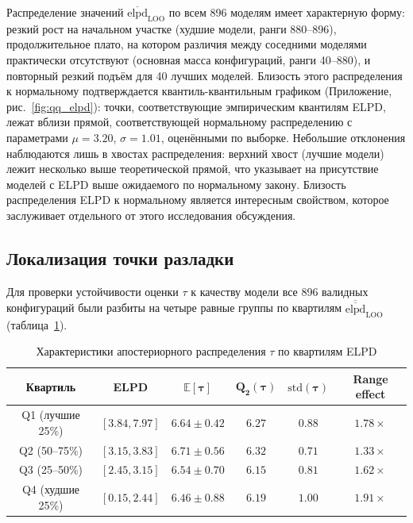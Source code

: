\documentclass[14pt]{mmcs_article}
\begin{document}
Распределение значений $\overline{\mathrm{elpd}}_{\mathrm{LOO}}$
по всем 896 моделям имеет характерную форму: резкий рост на
начальном участке (худшие модели, ранги 880--896),
продолжительное плато, на котором различия между соседними
моделями практически отсутствуют (основная масса
конфигураций, ранги 40--880), и повторный резкий подъём для
40 лучших моделей. Близость этого распределения к нормальному
подтверждается квантиль-квантильным графиком (Приложение, рис.~\ref{fig:qq_elpd}): точки, соответствующие
эмпирическим квантилям ELPD, лежат вблизи прямой,
соответствующей нормальному распределению с параметрами
$\mu = 3.20$, $\sigma = 1.01$, оценёнными по выборке.
Небольшие отклонения наблюдаются лишь в хвостах
распределения: верхний хвост (лучшие модели) лежит несколько
выше теоретической прямой, что указывает на присутствие
моделей с ELPD выше ожидаемого по нормальному закону. Близость распределения ELPD к нормальному является интересным свойством, которое заслуживает отдельного от этого исследования обсуждения.

\subsection{Локализация точки разладки}

Для проверки устойчивости оценки $\tau$ к качеству модели все
896 валидных конфигураций были разбиты на четыре равные группы
по квартилям $\overline{\overline{\mathrm{elpd}}}_{\mathrm{LOO}}$
(таблица~\ref{tab:tau_quartiles}).

\begin{table}[H]
	\centering
	\caption{Характеристики апостериорного распределения $\tau$
		по квартилям ELPD}
	\label{tab:tau_quartiles}
	\begin{tabular}{|c|c|c|c|c|c|}
		\hline
		\textbf{Квартиль} & \textbf{ELPD} & 
		$\boldsymbol{\mathbb{E}[\tau]}$ & 
		$\boldsymbol{Q_2(\tau)}$ & 
		$\boldsymbol{\mathrm{std}(\tau)}$ & 
		\textbf{Range effect} \\
		\hline
		Q1 (лучшие 25\%) & $[3.84, 7.97]$ & $6.64 \pm 0.42$ & $6.27$ & $0.88$ & $1.78\times$ \\
		\hline
		Q2 (50--75\%) & $[3.15, 3.83]$ & $6.71 \pm 0.56$ & $6.32$ & $0.71$ & $1.33\times$ \\
		\hline
		Q3 (25--50\%) & $[2.45, 3.15]$ & $6.54 \pm 0.70$ & $6.15$ & $0.81$ & $1.62\times$ \\
		\hline
		Q4 (худшие 25\%) & $[0.15, 2.44]$ & $6.46 \pm 0.88$ & $6.19$ & $1.00$ & $1.91\times$ \\
		\hline
	\end{tabular}
\end{table}
\end{document}
